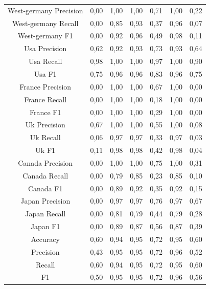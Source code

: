 \documentclass{classrep}
\begin{document}
\begin{table}[h!]
\begin{tabular}{c c c c c c c}
\hline
West-germany Precision 	& 0,00 & 1,00 & 1,00 & 0,71 & 1,00 & 0,22\\
West-germany Recall 		& 0,00 & 0,85 & 0,93 & 0,37 & 0,96 & 0,07\\
West-germany F1		& 0,00 & 0,92 & 0,96 & 0,49 & 0,98 & 0,11\\
\hline
Usa Precision 			& 0,62 & 0,92 & 0,93 & 0,73 & 0,93 & 0,64\\
Usa Recall				& 0,98 & 1,00 & 1,00 & 0,97 & 1,00 & 0,90\\
Usa F1			 	& 0,75 & 0,96 & 0,96 & 0,83 & 0,96 & 0,75\\
\hline
France Precision 		& 0,00 & 1,00 & 1,00 & 0,67 & 1,00 & 0,00\\
France Recall 			& 0,00 & 1,00 & 1,00 & 0,18 & 1,00 & 0,00\\
France F1 				& 0,00 & 1,00 & 1,00 & 0,29 & 1,00 & 0,00\\
\hline
Uk Precision 			& 0,67 & 1,00 & 1,00 & 0,55 & 1,00 & 0,08\\
Uk Recall 				& 0,06 & 0,97 & 0,97 & 0,33 & 0,97 & 0,03\\
Uk F1 				& 0,11 & 0,98 & 0,98 & 0,42 & 0,98 & 0,04\\
\hline
Canada Precision		& 0,00 & 1,00 & 1,00 & 0,75 & 1,00 & 0,31\\
Canada Recall 			& 0,00 & 0,79 & 0,85 & 0,23 & 0,85 & 0,10\\
Canada F1 			& 0,00 & 0,89 & 0,92 & 0,35 & 0,92 & 0,15\\
\hline
Japan Precision 		& 0,00 & 0,97 & 0,97 & 0,76 & 0,97 & 0,67\\
Japan Recall 			& 0,00 & 0,81 & 0,79 & 0,44 & 0,79 & 0,28\\
Japan F1 				& 0,00 & 0,89 & 0,87 & 0,56 & 0,87 & 0,39\\
\hline
Accuracy 				& 0,60 & 0,94 & 0,95 & 0,72 & 0,95 & 0,60\\
Precision 				& 0,43 & 0,95 & 0,95 & 0,72 & 0,96 & 0,52\\
Recall 				& 0,60 & 0,94 & 0,95 & 0,72 & 0,95 & 0,60\\
F1 					& 0,50 & 0,95 & 0,95 & 0,72 & 0,96 & 0,56\\

\end {tabular}
\label {Wyniki klasyfikacji dla różnych podzbiorów cech.}
\end{table}

\newpage
\end{document}
